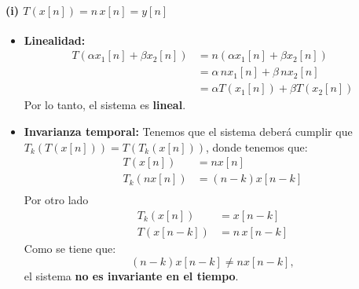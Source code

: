 \documentclass[
  11pt,
  letterpaper,
   addpoints,
  ]{exam}
\begin{document}
\begin{questions}
\begin{solution}
  \paragraph{(i) $T(x[n])= n \, x[n] = y[n]$}
\begin{itemize}
  \item \textbf{Linealidad:}
  \begin{align}
  T(\alpha x_1[n] + \beta x_2[n]) 
    &= n(\alpha x_1[n] + \beta x_2[n]) \\
    &= \alpha \, n x_1[n] + \beta \, n x_2[n] \\
    &= \alpha T(x_1[n]) + \beta T(x_2[n])
  \end{align}
  Por lo tanto, el sistema es \textbf{lineal}.
  \item \textbf{Invarianza temporal:}
  Tenemos que el sistema deberá cumplir que $T_{k}(T(x[n])) = T(T_{k}(x[n]))$, donde tenemos que:
  \begin{align}
  T(x[n]) &= n x[n] \\
  T_k(n x[n]) &= (n-k)x[n-k] \\
  \end{align}
  Por otro lado
  \begin{align}
  T_k(x[n]) &= x[n-k]\\
  T(x[n-k]) &= n \, x[n-k]
  \end{align}
  Como se tiene que:
  \begin{equation}
  (n-k)x[n-k] \neq n x[n-k],
  \end{equation}
  el sistema \textbf{no es invariante en el tiempo}.
\end{itemize}


\end{solution}
\end{questions}
\end{document}
